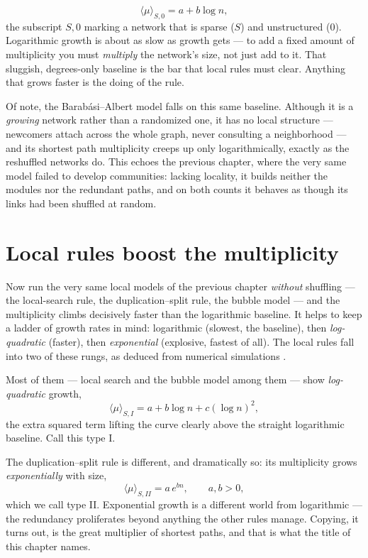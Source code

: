 \begin{equation}
  \langle\mu\rangle_{S,0} = a + b\log n,
  \label{eq:path-baseline}
\end{equation}
the subscript $S,0$ marking a network that is sparse ($S$) and unstructured
($0$). Logarithmic growth is about as slow as growth gets --- to add a fixed
amount of multiplicity you must \emph{multiply} the network's size, not just add
to it. That sluggish, degrees-only baseline is the bar that local rules must
clear. Anything that grows faster is the doing of the rule.

Of note, the Barab\'asi--Albert model falls on this same baseline. Although it is
a \emph{growing} network rather than a randomized one, it has no local structure
--- newcomers attach across the whole graph, never consulting a neighborhood ---
and its shortest path multiplicity creeps up only logarithmically, exactly as the
reshuffled networks do. This echoes the previous chapter, where the very same
model failed to develop communities: lacking locality, it builds neither the
modules nor the redundant paths, and on both counts it behaves as though its links
had been shuffled at random.

\section{Local rules boost the multiplicity}

Now run the very same local models of the previous chapter \emph{without} 
shuffling --- the local-search rule, the duplication--split rule, the bubble 
model --- and the multiplicity climbs decisively faster than the logarithmic 
baseline. It helps to keep a ladder of growth rates in mind: logarithmic 
(slowest, the baseline), then \emph{log-quadratic} (faster), then 
\emph{exponential} (explosive, fastest of all). The local rules fall into two of 
these rungs, as deduced from numerical simulations \citep{vazquezpaths2026}.

Most of them --- local search and the bubble model among them --- show
\emph{log-quadratic} growth,
\begin{equation}
  \langle\mu\rangle_{S,I} = a + b\log n + c(\log n)^2,
  \label{eq:path-typeI}
\end{equation}
the extra squared term lifting the curve clearly above the straight logarithmic
baseline. Call this type I.

The duplication--split rule is different, and dramatically so: its multiplicity
grows \emph{exponentially} with size,
\begin{equation}
  \langle\mu\rangle_{S,II} = a\, e^{bn}, \qquad a,b>0,
  \label{eq:path-typeII}
\end{equation}
which we call type II. Exponential growth is a different world from logarithmic
--- the redundancy proliferates beyond anything the other rules manage. Copying,
it turns out, is the great multiplier of shortest paths, and that is what the
title of this chapter names.

